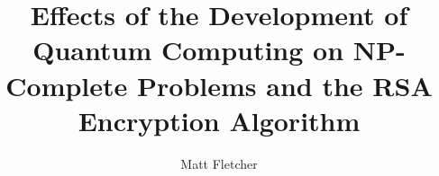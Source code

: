 \documentclass[10pt,journal,compsoc]{IEEEtran}
\begin{document}
%
\title{Effects of the Development of Quantum Computing on NP-Complete Problems and the RSA Encryption Algorithm}
%
%
%
%

\author{Matt Fletcher}


% 
%
\end{document}

